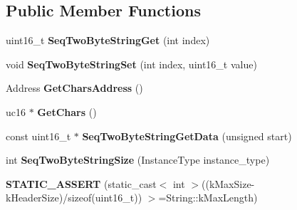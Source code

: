 \subsection*{Public Member Functions}
\begin{DoxyCompactItemize}
\item 
\hypertarget{classv8_1_1internal_1_1_seq_two_byte_string_ac94caf8a368f8726b88a3a562e7956a6}{}uint16\+\_\+t {\bfseries Seq\+Two\+Byte\+String\+Get} (int index)\label{classv8_1_1internal_1_1_seq_two_byte_string_ac94caf8a368f8726b88a3a562e7956a6}

\item 
\hypertarget{classv8_1_1internal_1_1_seq_two_byte_string_a2ac7928dd1839d6b8a5fb4a5c2d14d5f}{}void {\bfseries Seq\+Two\+Byte\+String\+Set} (int index, uint16\+\_\+t value)\label{classv8_1_1internal_1_1_seq_two_byte_string_a2ac7928dd1839d6b8a5fb4a5c2d14d5f}

\item 
\hypertarget{classv8_1_1internal_1_1_seq_two_byte_string_a748c0415d4f6a7b880d1b9c94d058090}{}Address {\bfseries Get\+Chars\+Address} ()\label{classv8_1_1internal_1_1_seq_two_byte_string_a748c0415d4f6a7b880d1b9c94d058090}

\item 
\hypertarget{classv8_1_1internal_1_1_seq_two_byte_string_afa5cf73f5a9c7bbe9a45a07a35c22dff}{}uc16 $\ast$ {\bfseries Get\+Chars} ()\label{classv8_1_1internal_1_1_seq_two_byte_string_afa5cf73f5a9c7bbe9a45a07a35c22dff}

\item 
\hypertarget{classv8_1_1internal_1_1_seq_two_byte_string_a1e9587b8bd4ab86ec0dc7babaa2f21f8}{}const uint16\+\_\+t $\ast$ {\bfseries Seq\+Two\+Byte\+String\+Get\+Data} (unsigned start)\label{classv8_1_1internal_1_1_seq_two_byte_string_a1e9587b8bd4ab86ec0dc7babaa2f21f8}

\item 
\hypertarget{classv8_1_1internal_1_1_seq_two_byte_string_ae3726273ad079d4bb0ec9d4d56fa9358}{}int {\bfseries Seq\+Two\+Byte\+String\+Size} (Instance\+Type instance\+\_\+type)\label{classv8_1_1internal_1_1_seq_two_byte_string_ae3726273ad079d4bb0ec9d4d56fa9358}

\item 
\hypertarget{classv8_1_1internal_1_1_seq_two_byte_string_a7cc8c6f7692a23cbeb30626550e984ff}{}{\bfseries S\+T\+A\+T\+I\+C\+\_\+\+A\+S\+S\+E\+R\+T} (static\+\_\+cast$<$ int $>$((k\+Max\+Size-\/k\+Header\+Size)/sizeof(uint16\+\_\+t)) $>$=String\+::k\+Max\+Length)\label{classv8_1_1internal_1_1_seq_two_byte_string_a7cc8c6f7692a23cbeb30626550e984ff}

\end{DoxyCompactItemize}
